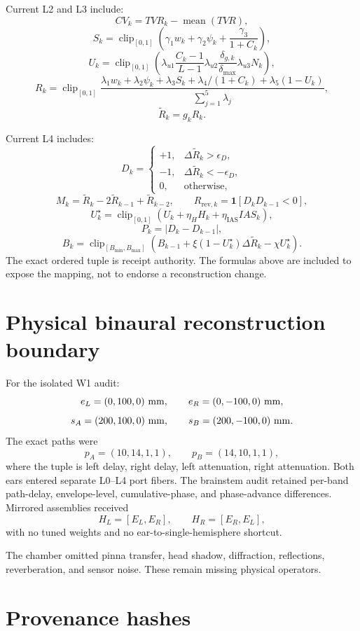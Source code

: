 \documentclass[11pt,oneside]{article}
\newcommand{\clip}{\operatorname{clip}}
\begin{document}
Current L2 and L3 include:
\[
  CV_k=TVR_k-\operatorname{mean}(TVR),
\]
\[
  S_k=\clip_{[0,1]}
  \left(
    \gamma_1w_k+\gamma_2\psi_k+
    \frac{\gamma_3}{1+C_k}
  \right),
\]
\[
  U_k=\clip_{[0,1]}
  \left(
    \lambda_{u1}\frac{C_k-1}{L-1}
    \lambda_{u2}\frac{\delta_{g,k}}{\delta_{\max}}
    \lambda_{u3}N_k
  \right),
\]
\[
  R_k=\clip_{[0,1]}
  \frac{
    \lambda_1w_k+\lambda_2\psi_k+\lambda_3S_k+
    \lambda_4/(1+C_k)+\lambda_5(1-U_k)
  }{\sum_{j=1}^{5}\lambda_j},
\]
\[
  \widetilde R_k=g_kR_k.
\]

Current L4 includes:
\[
  D_k=
  \begin{cases}
  +1,&\Delta\widetilde R_k>\epsilon_D,\\
  -1,&\Delta\widetilde R_k<-\epsilon_D,\\
  0,&\text{otherwise},
  \end{cases}
\]
\[
  M_k=\widetilde R_k-2\widetilde R_{k-1}+\widetilde R_{k-2},
\qquad
  R_{\mathrm{rev},k}=\mathbf{1}[D_kD_{k-1}<0],
\]
\[
  U^\star_k=
  \clip_{[0,1]}(U_k+\eta_HH_k+\eta_{\mathrm{IAS}}IAS_k),
\]
\[
  P_k=|D_k-D_{k-1}|,
\]
\[
  B_k=
  \clip_{[B_{\min},B_{\max}]}
  \left(
    B_{k-1}+\xi(1-U^\star_k)\Delta\widetilde R_k-\chi U^\star_k
  \right).
\]
The exact ordered tuple is receipt authority. The formulas above are included
to expose the mapping, not to endorse a reconstruction change.

\section{Physical binaural reconstruction boundary}

For the isolated W1 audit:
\[
  e_L=(0,100,0)\ {\rm mm},\qquad
  e_R=(0,-100,0)\ {\rm mm},
\]
\[
  s_A=(200,100,0)\ {\rm mm},\qquad
  s_B=(200,-100,0)\ {\rm mm}.
\]
The exact paths were
\[
  p_A=(10,14,1,1),\qquad p_B=(14,10,1,1),
\]
where the tuple is left delay, right delay, left attenuation, right
attenuation. Both ears entered separate L0--L4 port fibers. The brainstem audit
retained per-band path-delay, envelope-level, cumulative-phase, and
phase-advance differences. Mirrored assemblies received
\[
  H_L=[E_L,E_R],\qquad H_R=[E_R,E_L],
\]
with no tuned weights and no ear-to-single-hemisphere shortcut.

The chamber omitted pinna transfer, head shadow, diffraction, reflections,
reverberation, and sensor noise. These remain missing physical operators.

\section{Provenance hashes}
\label{app:provenance}
\end{document}
